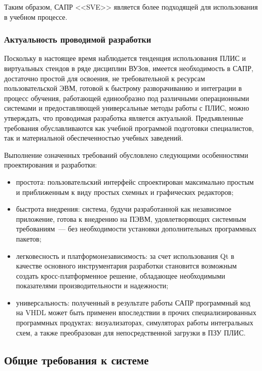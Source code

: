 Таким образом, САПР <<SVE>> является более подходящей для использования в учебном процессе.
%
%
\subsubsection{Актуальность проводимой разработки} \label{sec:characteristics:actual}
Поскольку в настоящее время наблюдается тенденция использования ПЛИС и виртуальных стендов в ряде дисциплин ВУЗов, имеется необходимость в САПР, достаточно простой для освоения, не требовательной к ресурсам пользовательской ЭВМ, готовой к быстрому разворачиванию и интеграции в процесс обучения, работающей единообразно под различными операционными системами и предоставляющей универсальные методы работы с ПЛИС, можно утверждать, что проводимая разработка является актуальной.
Предъявленные требования обуславливаются как учебной программой подготовки специалистов, так и материальной обеспеченностью учебных заведений.

Выполнение означенных требований обусловлено следующими особенностями проектирования и разработки:
\begin{itemize}
  \item простота: пользовательский интерфейс спроектирован максимально простым и приближенным к виду простых схемных и графических редакторов;
  \item быстрота внедрения: система, будучи разработанной как независимое приложение, готова к внедрению на ПЭВМ, удовлетворяющих системным требованиям~--- без необходимости установки дополнительных программных пакетов;
  \item легковесность и платформонезависимость: за счет использования Qt в качестве основного инструментария разработки становится возможным создать кросс-платформенное решение, обладающее необходимыми показателями производительности и надежности;
  \item универсальность: полученный в результате работы САПР программный код на VHDL может быть применен впоследствии в прочих специализированных программных продуктах: визуализаторах, симуляторах работы интегральных схем, а также преобразован для непосредственной загрузки в ПЗУ ПЛИС.
\end{itemize}
%
%
%
\subsection{Общие требования к системе} \label{sec:requirements}

